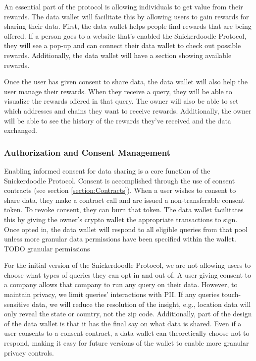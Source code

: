 An essential part of the protocol is allowing individuals to get value from their rewards. The data wallet will facilitate this by allowing users 
to gain rewards for sharing their data. First, the data wallet helps people find rewards that are being offered. If a person goes to a website 
that's enabled the Snickerdoodle Protocol, they will see a pop-up and can connect their data wallet to check out possible rewards. Additionally, 
the data wallet will have a section showing available rewards.


Once the user has given consent to share data, the data wallet will also help the user manage their rewards. When they receive a query, they will 
be able to visualize the rewards offered in that query. The owner will also be able to set which addresses and chains they want to receive rewards. 
Additionally, the owner will be able to see the history of the rewards they've received and the data exchanged. 

\subsubsection{Authorization and Consent Management}
Enabling informed consent for data sharing is a core function of the Snickerdoodle Protocol. Consent is accomplished through the use of consent contracts 
(see section \ref{section:Contracts}). When a user wishes to consent to share data, they make a contract call and are issued a non-transferable consent 
token. To revoke consent, they can burn that token. The data wallet facilitates this by giving the owner's crypto wallet the appropriate transactions to 
sign. Once opted in, the data wallet will respond to all eligible queries from that pool unless more granular data permissions have been specified within 
the wallet. TODO granular permissions


For the initial version of the Snickerdoodle Protocol, we are not allowing users to choose what types of queries they can opt in and out of. A user giving 
consent to a company allows that company to run any query on their data. However, to maintain privacy, we limit queries' interactions with PII. If any 
queries touch-sensitive data, we will reduce the resolution of the insight, e.g., location data will only reveal the state or country, not the zip code. 
Additionally, part of the design of the data wallet is that it has the final say on what data is shared. Even if a user consents to a consent contract, a 
data wallet can theoretically choose not to respond, making it easy for future versions of the wallet to enable more granular privacy controls.

